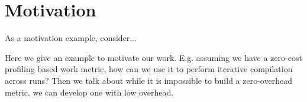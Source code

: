 \section{Motivation}

As a motivation example, consider...

Here we give an example to motivate our work. E.g. assuming we have a zero-cost profiling based work metric, 
how can we use it to perform iterative compilation across runs? Then we talk about while it is impossible to 
build a zero-overhead metric, we can develop one with low overhead. 